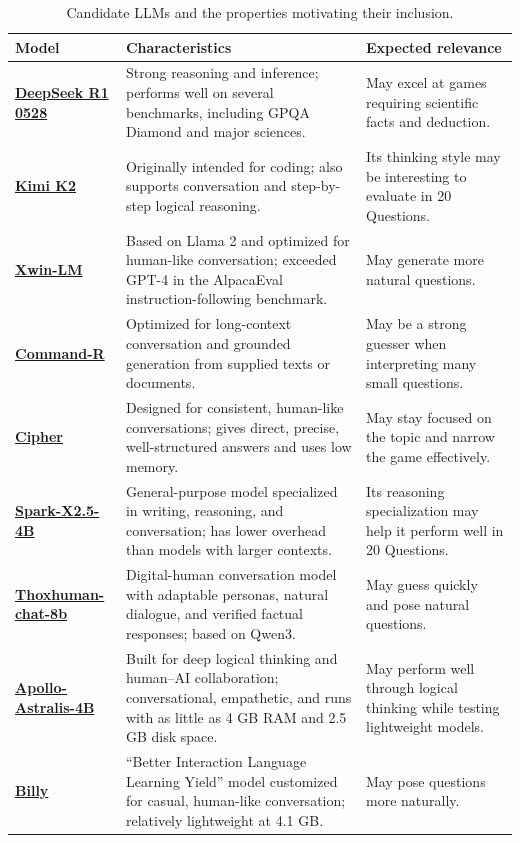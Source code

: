 \documentclass[10pt]{article}
\begin{document}
\begin{table}[htbp]
\small
\setlength{\tabcolsep}{4pt}
\renewcommand{\arraystretch}{1.08}
\begin{tabularx}{\textwidth}{@{}p{}X X@{}}
\toprule
\textbf{Model} & \textbf{Characteristics} & \textbf{Expected relevance} \\
\midrule
\textbf{\hyperlink{ref-deepseek}{DeepSeek R1 0528}} &
Strong reasoning and inference; performs well on several benchmarks,
including GPQA Diamond and major sciences. &
May excel at games requiring scientific facts and deduction. \\
\textbf{\hyperlink{ref-kimi}{Kimi K2}} &
Originally intended for coding; also supports conversation and step-by-step
logical reasoning. &
Its thinking style may be interesting to evaluate in 20 Questions. \\
\textbf{\hyperlink{ref-xwin}{Xwin-LM}} &
Based on Llama 2 and optimized for human-like conversation; exceeded GPT-4
in the AlpacaEval instruction-following benchmark. &
May generate more natural questions. \\
\textbf{\hyperlink{ref-command-r}{Command-R}} &
Optimized for long-context conversation and grounded generation from supplied
texts or documents. &
May be a strong guesser when interpreting many small questions. \\
\textbf{\hyperlink{ref-cipher}{Cipher}} &
Designed for consistent, human-like conversations; gives direct, precise,
well-structured answers and uses low memory. &
May stay focused on the topic and narrow the game effectively. \\
\textbf{\hyperlink{ref-spark}{Spark-X2.5-4B}} &
General-purpose model specialized in writing, reasoning, and conversation;
has lower overhead than models with larger contexts. &
Its reasoning specialization may help it perform well in 20 Questions. \\
\textbf{\hyperlink{ref-thox}{Thoxhuman-chat-8b}} &
Digital-human conversation model with adaptable personas, natural dialogue,
and verified factual responses; based on Qwen3. &
May guess quickly and pose natural questions. \\
\textbf{\hyperlink{ref-apollo}{Apollo-Astralis-4B}} &
Built for deep logical thinking and human--AI collaboration; conversational,
empathetic, and runs with as little as 4 GB RAM and 2.5 GB disk space. &
May perform well through logical thinking while testing lightweight models. \\
\textbf{\hyperlink{ref-billy}{Billy}} &
``Better Interaction Language Learning Yield'' model customized for casual,
human-like conversation; relatively lightweight at 4.1 GB. &
May pose questions more naturally. \\
\bottomrule
\end{tabularx}
\caption{Candidate LLMs and the properties motivating their inclusion.}
\end{table}
\end{document}
